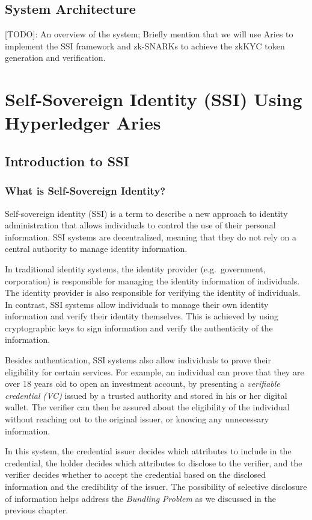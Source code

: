 \documentclass[
]{report}
\begin{document}
\section{System Architecture}

{[}TODO{]}: An overview of the system; Briefly mention that we
will use Aries to implement the SSI framework and zk-SNARKs to achieve
the zkKYC token generation and verification.

\chapter{Self-Sovereign Identity (SSI) Using Hyperledger Aries}

\section{Introduction to SSI}
\subsection{What is Self-Sovereign Identity?}
Self-sovereign identity (SSI) is a term to describe a new approach to
identity administration that allows individuals to control the use of
their personal information. SSI systems are decentralized, meaning that
they do not rely on a central authority to manage identity information.

In traditional identity systems, the identity provider (e.g.~government,
corporation) is responsible for managing the identity information of
individuals. The identity provider is also responsible for verifying
the identity of individuals. In contrast, SSI systems allow individuals
to manage their own identity information and verify their identity
themselves. This is achieved by using cryptographic keys to sign
information and verify the authenticity of the information.

Besides authentication, SSI systems also allow individuals to prove their
eligibility for certain services. For example, an individual can prove
that they are over 18 years old to open an investment account, by
presenting a \emph{verifiable credential (VC)} issued by a trusted
authority and stored in his or her digital wallet. The verifier can
then be assured about the eligibility of the individual without reaching
out to the original issuer, or knowing any unnecessary information.

In this system, the credential issuer decides which attributes to include in
the credential, the holder decides which attributes to disclose to the verifier,
and the verifier decides whether to accept the credential based on the disclosed
information and the credibility of the issuer. The possibility of selective
disclosure of information helps address the \emph{Bundling Problem} as we
discussed in the previous chapter.
\end{document}
